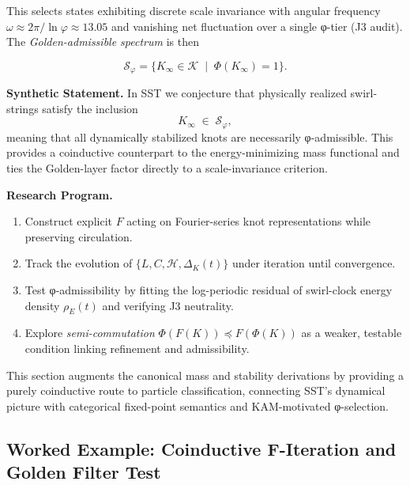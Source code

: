         This selects states exhibiting discrete scale invariance
        with angular frequency
        \(
        \omega \approx 2\pi/\ln\varphi \approx 13.05
        \)
        and vanishing net fluctuation over a single φ-tier (J3 audit).
        The \emph{Golden-admissible spectrum} is then

        \[
            \mathcal{S}_\varphi = \{K_\infty \in \mathcal{K} \;\mid\; \Phi(K_\infty)=1 \}.
        \]

        \medskip

        \noindent
        \textbf{Synthetic Statement.}
        In SST we conjecture that physically realized swirl-strings
        satisfy the inclusion
        \[
            K_\infty \;\in\; \mathcal{S}_\varphi,
        \]
        meaning that all dynamically stabilized knots are necessarily φ-admissible.
        This provides a coinductive counterpart to the energy-minimizing mass functional
        and ties the Golden-layer factor directly to a scale-invariance criterion.

        \medskip

        \noindent
        \textbf{Research Program.}
        \begin{enumerate}[label=\roman*)]
            \item Construct explicit \(F\) acting on Fourier-series knot representations while
            preserving circulation.
            \item Track the evolution of \(\{L,C,\mathcal{H},\Delta_K(t)\}\) under iteration until convergence.
            \item Test φ-admissibility by fitting the log-periodic residual of swirl-clock energy density
            \(\rho_{\!E}(t)\) and verifying J3 neutrality.
            \item Explore \emph{semi-commutation} \(\Phi(F(K)) \preceq F(\Phi(K))\) as a weaker,
            testable condition linking refinement and admissibility.
        \end{enumerate}

        \noindent
        This section augments the canonical mass and stability derivations by
        providing a purely coinductive route to particle classification,
        connecting SST’s dynamical picture with categorical fixed-point semantics
        and KAM-motivated φ-selection.


        \subsection*{Worked Example: Coinductive F-Iteration and Golden Filter Test}
            \label{subsec:coinductive-golden-example}

